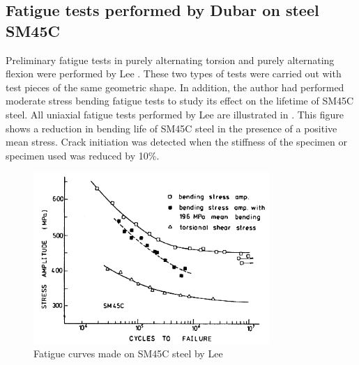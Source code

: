 \subsection{Fatigue tests performed by Dubar on steel SM45C}
Preliminary fatigue tests in purely alternating torsion and purely alternating flexion were performed by Lee \cite{lee2013out}. These two types of tests were carried out with test pieces of the same geometric shape. In addition, the author had performed moderate stress bending fatigue tests to study its effect on the lifetime of SM45C steel. All uniaxial fatigue tests performed by Lee \cite{lee2013out} are illustrated in . This figure shows a reduction in bending life of SM45C steel in the presence of a positive mean stress. Crack initiation was detected when the stiffness of the specimen or specimen used was reduced by 10\%.
\begin{figure}[!h]
\centering
\includegraphics[width=0.8\textwidth]{figures//SM45C_SN.png} 
\caption{Fatigue curves made on SM45C steel by Lee \cite{lee2013out}}
\label{fig.SM45CSN}
\end{figure}


